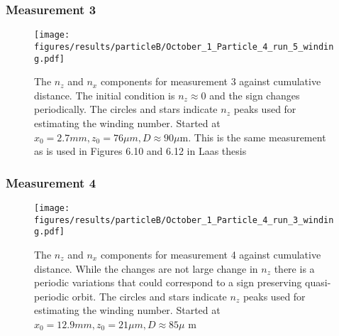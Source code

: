 \subsubsection{Measurement 3}
\begin{figure}[H]
\begin{center}
\texttt{[image: figures/results/particleB/October\_1\_Particle\_4\_run\_5\_winding.pdf]}
\end{center}
\caption{The $n_z$ and $n_x$ components for measurement 3 against cumulative distance. The initial condition is $n_z \approx 0$ and the sign changes periodically. The circles and stars indicate $n_z$ peaks used for estimating the winding number. Started at $x_0 = 2.7 mm, z_0 = 76\mu m, D \approx 90\mu$m. This is the same measurement as is used in Figures 6.10 and 6.12 in Laas thesis~\cite{alexanderThesis}}
\label{fig:particleB3}
\end{figure}


\subsubsection{Measurement 4}
\begin{figure}[H]
\begin{center}
\texttt{[image: figures/results/particleB/October\_1\_Particle\_4\_run\_3\_winding.pdf]}
\end{center}
\caption{The $n_z$ and $n_x$ components for measurement 4 against cumulative distance. While the changes are not large change in $n_z$ there is a periodic variations that could correspond to a sign preserving quasi-periodic orbit.  The circles and stars indicate $n_z$ peaks used for estimating the winding number. Started at $x_0 = 12.9 mm, z_0 = 21\mu m, D \approx 85\mu$ m}
\label{fig:particleB4}
\end{figure}